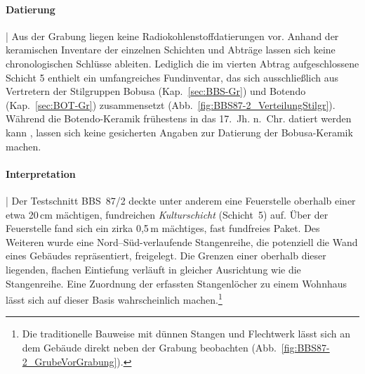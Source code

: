 \paragraph{Datierung}\hspace{-.5em}|\hspace{.5em}%
Aus der Grabung liegen keine Radiokohlenstoffdatierungen vor. Anhand der keramischen Inventare der einzelnen Schichten und Abträge lassen sich keine chronologischen Schlüsse ableiten. Lediglich die im vierten Abtrag aufgeschlossene Schicht 5 enthielt ein umfangreiches Fundinventar, das sich ausschließlich aus Vertretern der Stilgruppen Bobusa (Kap.~\ref{sec:BBS-Gr}) und Botendo (Kap.~\ref{sec:BOT-Gr}) zusammensetzt (Abb.~\ref{fig:BBS87-2_VerteilungStilgr}). Während die Botendo-Keramik frühestens in das 17.~Jh. n.~Chr. datiert werden kann \parencite[157\,f.]{Wotzka.1995}, lassen sich keine gesicherten Angaben zur Datierung der Bobusa-Keramik machen.

\paragraph{Interpretation}\hspace{-.5em}|\hspace{.5em}%
Der Testschnitt BBS~87/2 deckte unter anderem eine Feuerstelle oberhalb einer etwa 20\,cm mächtigen, fundreichen \textit{Kulturschicht} (Schicht~5) auf. Über der Feuerstelle fand sich ein zirka 0,5\,m mächtiges, fast fundfreies Paket. Des Weiteren wurde eine Nord--Süd-verlaufende Stangenreihe, die potenziell die Wand eines Gebäudes repräsentiert, freigelegt. Die Grenzen einer oberhalb dieser liegenden, flachen Eintiefung verläuft in gleicher Ausrichtung wie die Stangenreihe. Eine Zuordnung der erfassten Stangenlöcher zu einem Wohnhaus lässt sich auf dieser Basis wahrscheinlich machen.\footnote{Die traditionelle Bauweise mit dünnen Stangen und Flechtwerk lässt sich an dem Gebäude direkt neben der Grabung beobachten (Abb.~\ref{fig:BBS87-2_GrubeVorGrabung}).}
